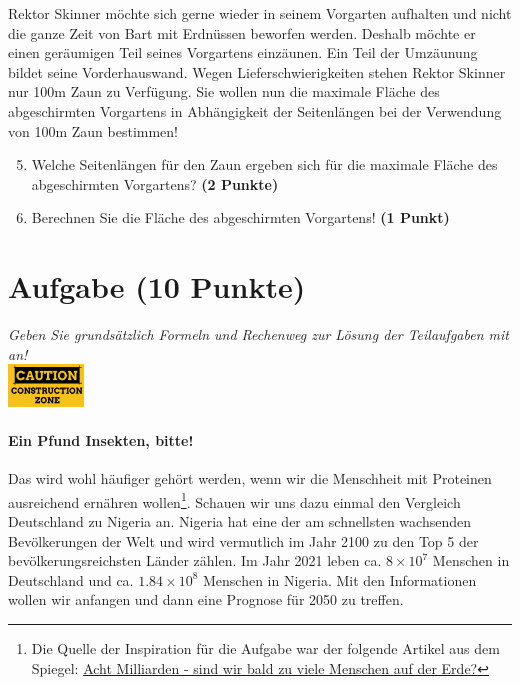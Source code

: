 \documentclass[a4paper, 10pt]{scrartcl}\usepackage[]{graphicx}\usepackage[]{xcolor}
\begin{document}
Rektor Skinner m{\"o}chte sich gerne wieder in seinem Vorgarten aufhalten und
nicht die ganze Zeit von Bart mit Erdn{\"u}ssen beworfen werden. Deshalb m{\"o}chte
er einen ger{\"a}umigen Teil seines Vorgartens einz{\"a}unen. Ein Teil der
Umz{\"a}unung bildet seine Vorderhauswand. Wegen Lieferschwierigkeiten stehen
Rektor Skinner nur 100m Zaun zu Verf{\"u}gung. Sie wollen nun die
maximale Fl{\"a}che des abgeschirmten Vorgartens in Abh{\"a}ngigkeit der
Seitenl{\"a}ngen bei der Verwendung von 100m Zaun bestimmen!

\begin{enumerate}
  \setcounter{enumi}{4}  
\item  Welche Seitenl{\"a}ngen f{\"u}r den Zaun ergeben sich f{\"u}r die
  maximale Fl{\"a}che des abgeschirmten Vorgartens? \textbf{(2 Punkte)}
\item Berechnen Sie die Fl{\"a}che des abgeschirmten Vorgartens! \textbf{(1
    Punkt)}
\end{enumerate}

 
\clearpage

\section{Aufgabe \hfill (10 Punkte)}

\textit{Geben Sie grunds{\"a}tzlich Formeln und Rechenweg zur L{\"o}sung der
  Teilaufgaben mit an!} \\[1Ex]

\hfill\href{}{\includegraphics[width = 2cm]{img/caution}} %
\hspace{2Ex}




\paragraph{Ein Pfund Insekten, bitte!} Das wird wohl h{\"a}ufiger geh{\"o}rt 
werden, wenn wir die Menschheit mit Proteinen ausreichend ern{\"a}hren wollen\footnote{Die Quelle der Inspiration f{\"u}r die Aufgabe war der folgende
  Artikel aus dem Spiegel: \href{https://www.spiegel.de/ausland/ueberbevoelkerung-acht-milliarden-sind-wir-bald-zu-viele-menschen-auf-der-erde-a-3f20c7bc-3d60-4440-9f52-eb338db207f5}{Acht Milliarden - sind wir bald zu viele Menschen
  auf der Erde?}}. Schauen wir uns dazu einmal den Vergleich Deutschland zu
Nigeria an. Nigeria hat eine der am schnellsten wachsenden Bev{\"o}lkerungen der
Welt und wird vermutlich im Jahr 2100 zu den Top 5 der bev{\"o}lkerungsreichsten
L{\"a}nder z{\"a}hlen. Im Jahr 2021 leben ca. \ensuremath{8\times 10^{7}} Menschen in Deutschland und
ca. \ensuremath{1.84\times 10^{8}} Menschen in Nigeria. Mit den Informationen wollen wir
anfangen und dann eine Prognose f{\"u}r 2050 zu treffen. \\  
\end{document}

